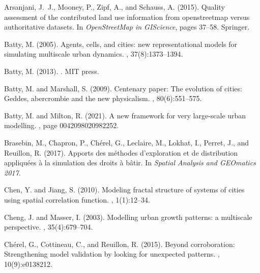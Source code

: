 \documentclass[letterpaper]{article}
\begin{document}
\begin{thebibliography}{}

Arsanjani, J.~J., Mooney, P., Zipf, A., and Schauss, A. (2015).
\newblock Quality assessment of the contributed land use information from
  openstreetmap versus authoritative datasets.
\newblock In {\em OpenStreetMap in GIScience}, pages 37--58. Springer.

Batty, M. (2005).
\newblock Agents, cells, and cities: new representational models for simulating
  multiscale urban dynamics.
, 37(8):1373--1394.

Batty, M. (2013).
.
\newblock MIT press.

Batty, M. and Marshall, S. (2009).
\newblock Centenary paper: The evolution of cities: Geddes, abercrombie and the
  new physicalism.
, 80(6):551--575.

Batty, M. and Milton, R. (2021).
\newblock A new framework for very large-scale urban modelling.
, page 0042098020982252.

Brasebin, M., Chapron, P., Ch{\'e}rel, G., Leclaire, M., Lokhat, I., Perret,
  J., and Reuillon, R. (2017).
\newblock Apports des m{\'e}thodes d'exploration et de distribution
  appliqu{\'e}es {\`a} la simulation des droits {\`a} b{\^a}tir.
\newblock In {\em Spatial Analysis and GEOmatics 2017}.

Chen, Y. and Jiang, S. (2010).
\newblock Modeling fractal structure of systems of cities using spatial
  correlation function.
,
  1(1):12--34.

Cheng, J. and Masser, I. (2003).
\newblock Modelling urban growth patterns: a multiscale perspective.
, 35(4):679--704.

Ch{\'e}rel, G., Cottineau, C., and Reuillon, R. (2015).
\newblock Beyond corroboration: Strengthening model validation by looking for
  unexpected patterns.
, 10(9):e0138212.


\end{thebibliography}
\end{document}
